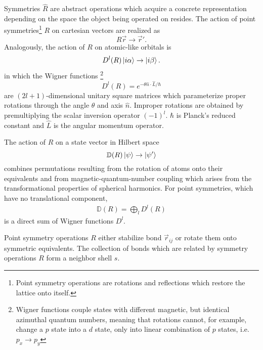 \documentclass[twocolumn,showpacs,preprintnumbers,superscriptaddress,prb,floatfix,aps,10pt]{revtex4-1}
\newcommand*{\wignerD}{\mathbb{D}}%
\newcommand*{\wignerDl}{D^{l}}%
\newcommand*{\bondvec}{\vec{r}_{ij}}
\begin{document}
Symmetries $\hat{R}$ are abstract operations which acquire a concrete representation depending on the space the object being operated on resides. The action of point symmetries\footnote{Point symmetry operations are rotations and reflections which restore the lattice onto itself.} $R$ on cartesian vectors are realized as
\begin{equation}
R \vec{r} \rightarrow \vec{r} '.
\end{equation}
Analogously, the action of $R$ on atomic-like orbitals is
\begin{equation}
\wignerDl(R)\ket{i\alpha} \rightarrow \ket{i\beta}.
\end{equation}
in which the Wigner functions \footnote{Wigner functions couple states with different magnetic, but identical azimuthal quantum numbers, meaning that rotations cannot, for example, change a $p$ state into a $d$ state, only into linear combination of $p$ states, i.e. $p_x \rightarrow p_y$}
\begin{equation}
\wignerDl(R) = e^{- \theta \hat{n} \cdot \hat{L} /\hbar}
\end{equation}
are $(2l+1)$-dimensional unitary square matrices which parameterize proper rotations through the angle $\theta$ and axis $\hat{n}$. Improper rotations are obtained by premultiplying the scalar inversion operator $(-1)^l$. \cite{sharma_general_1979,el-batanouny_symmetry_2008} $\hbar$ is Planck's reduced constant and $\hat{L}$ is the angular momentum operator. %

The action of $R$ on a state vector in Hilbert space
\begin{equation}
\wignerD(R) \ket{\psi} \rightarrow \ket{\psi'}
\end{equation}
combines permutations resulting from the rotation of atoms onto their equivalents and from magnetic-quantum-number coupling which arises from the transformational properties of spherical harmonics. For point symmetries, which have no translational component, 
\begin{align}
\wignerD(R) = \bigoplus_l \wignerDl(R)
\end{align}
%
is a direct sum of Wigner functions $\wignerDl$. 




Point symmetry operations $R$ either stabilize bond $\bondvec$ or rotate them onto symmetric equivalents. The collection of bonds which are related by symmetry operations $R$ form a neighbor shell $s$. 
\end{document}
